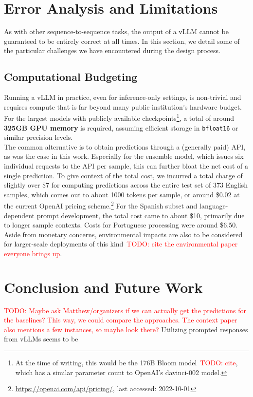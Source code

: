 \documentclass[11pt]{article}
\newcommand{\todo}[1]{\textcolor{red}{TODO: #1}}
\begin{document}
\section{Error Analysis and Limitations}

As with other sequence-to-sequence tasks, the output of a vLLM cannot be guaranteed to be entirely correct at all times.
In this section, we detail some of the particular challenges we have encountered during the design process.

\subsection{Computational Budgeting}
Running a vLLM in practice, even for inference-only settings, is non-trivial and requires compute that is far beyond many public institution's hardware budget. For the largest models with publicly available checkpoints\footnote{At the time of writing, this would be the 176B Bloom model~\todo{cite}, which has a similar parameter count to OpenAI's davinci-002 model.}, a total of around \textbf{325GB GPU memory} is required, assuming efficient storage in \texttt{bfloat16} or similar precision levels.\\
The common alternative is to obtain predictions through a (generally paid) API, as was the case in this work. Especially for the ensemble model, which issues six individual requests to the API per sample, this can further bloat the net cost of a single prediction.
To give context of the total cost, we incurred a total charge of slightly over \$7 for computing predictions across the entire test set of 373 English samples, which comes out to about 1000 tokens per sample, or around \$0.02 at the current OpenAI pricing scheme.\footnote{\url{https://openai.com/api/pricing/}, last accessed: 2022-10-01}
For the Spanish subset and language-dependent prompt development, the total cost came to about \$10, primarily due to longer sample contexts. Costs for Portuguese processing were around \$6.50.
Aside from monetary concerns, environmental impacts are also to be considered for larger-scale deployments of this kind~\todo{cite the environmental paper everyone brings up}.


\section{Conclusion and Future Work}
\todo{Maybe ask Matthew/organizers if we can actually get the predictions for the baselines? This way, we could compare the approaches. The context paper also mentions a few instances, so maybe look there?}
Utilizing prompted responses from vLLMs seems to be 
\end{document}
